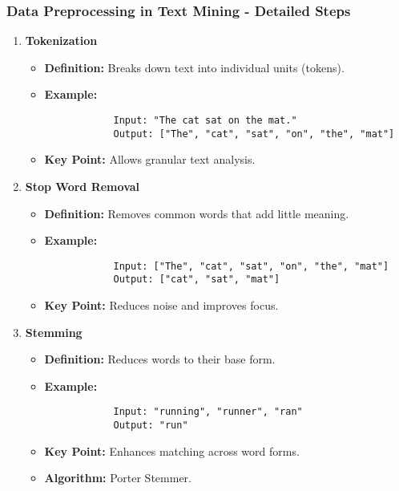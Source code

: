 \documentclass[aspectratio=169]{beamer}
\begin{document}
\begin{frame}[fragile]
    \frametitle{Data Preprocessing in Text Mining - Detailed Steps}

    \begin{enumerate}
        \item \textbf{Tokenization}  
        \begin{itemize}
            \item \textbf{Definition:} Breaks down text into individual units (tokens).
            \item \textbf{Example:} 
            \begin{lstlisting}
            Input: "The cat sat on the mat."
            Output: ["The", "cat", "sat", "on", "the", "mat"]
            \end{lstlisting}
            \item \textbf{Key Point:} Allows granular text analysis.
        \end{itemize}

        \item \textbf{Stop Word Removal}  
        \begin{itemize}
            \item \textbf{Definition:} Removes common words that add little meaning.
            \item \textbf{Example:} 
            \begin{lstlisting}
            Input: ["The", "cat", "sat", "on", "the", "mat"]
            Output: ["cat", "sat", "mat"]
            \end{lstlisting}
            \item \textbf{Key Point:} Reduces noise and improves focus.
        \end{itemize}

        \item \textbf{Stemming}  
        \begin{itemize}
            \item \textbf{Definition:} Reduces words to their base form.
            \item \textbf{Example:} 
            \begin{lstlisting}
            Input: "running", "runner", "ran"
            Output: "run"
            \end{lstlisting}
            \item \textbf{Key Point:} Enhances matching across word forms.
            \item \textbf{Algorithm:} Porter Stemmer.
        \end{itemize}


\end{enumerate}
\end{frame}
\end{document}
